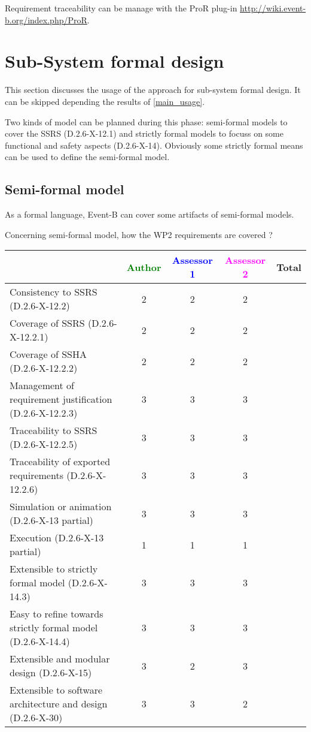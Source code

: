 \begin{author_comment}
Requirement traceability can be manage with the ProR plug-in \url{http://wiki.event-b.org/index.php/ProR}.
\end{author_comment}

\section{Sub-System formal design}
This section discusses the usage of the approach for sub-system formal design.
It can be skipped depending the results of \ref{main_usage}.

Two kinds of model can be planned during this phase: semi-formal models to  cover the SSRS (D.2.6-X-12.1) and strictly formal  models to  focuss on some functional and safety aspects (D.2.6-X-14).  Obviously some strictly  formal means can be used to define the semi-formal  model.

\subsection{Semi-formal model}


\begin{author_comment}
As a formal language, Event-B  can cover some artifacts of semi-formal models.
\end{author_comment}

Concerning semi-formal model, how the WP2 requirements are covered ?

\begin{tabular}{|l | c | c | c | c|}
\hline
& \textcolor{green}{Author} & \textcolor{blue}{Assessor 1} & \textcolor{magenta}{Assessor 2} & Total \\
\hline 
Consistency to SSRS (D.2.6-X-12.2) & 2 & 2 & 2 &  \\
\hline
Coverage of SSRS (D.2.6-X-12.2.1)  & 2 & 2 & 2 &  \\
\hline
Coverage of SSHA (D.2.6-X-12.2.2)  & 2 & 2 & 2 &  \\
\hline
Management of requirement justification (D.2.6-X-12.2.3)  & 3 & 3 & 3 &  \\
\hline
Traceability to  SSRS (D.2.6-X-12.2.5)  & 3 & 3 & 3 &  \\
\hline
Traceability of exported requirements (D.2.6-X-12.2.6)  & 3 & 3 & 3 &  \\
\hline
Simulation or animation (D.2.6-X-13 partial)  & 3 & 3 & 3 &  \\
\hline
Execution (D.2.6-X-13 partial)  & 1 & 1 & 1 &  \\
\hline
Extensible to strictly formal model (D.2.6-X-14.3) & 3 & 3 & 3 &  \\
\hline
Easy to  refine towards strictly formal model (D.2.6-X-14.4) & 3 & 3 & 3 &  \\
\hline
Extensible and modular design (D.2.6-X-15)  & 3 & 2 & 3 &  \\
\hline
Extensible to software architecture and design (D.2.6-X-30)   & 3 & 3 & 2 &  \\
\hline
\end{tabular}



